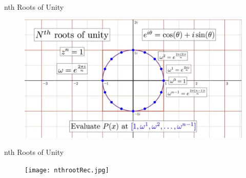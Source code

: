 \documentclass{beamer}
\begin{document}
\begin{frame}{nth Roots of Unity}

       \centering

        \begin{figure}
           \centering
           \includegraphics[width=1\textwidth]{nthroot.jpg}
           
           \label{fig:enter-label}
       \end{figure}
       

        
       \end{frame}

       
\begin{frame}{nth Roots of Unity}
       \centering
        \begin{figure}
           \centering
           \texttt{[image: nthrootRec.jpg]}
           
           \label{fig:enter-label}
       \end{figure}
       
       \end{frame}
       
\end{document}
